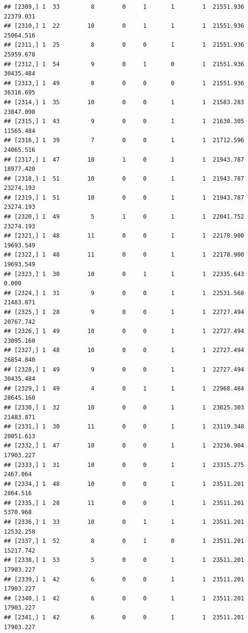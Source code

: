 \documentclass[
]{article}
\begin{document}
\begin{verbatim}
## [2309,] 1  33         8        0     1       1        1  21551.936  22379.031
## [2310,] 1  22        10        0     1       1        1  21551.936  25064.516
## [2311,] 1  25         8        0     0       1        1  21551.936  25959.678
## [2312,] 1  54         9        0     1       0        1  21551.936  30435.484
## [2313,] 1  49         8        0     0       0        1  21551.936  36316.695
## [2314,] 1  35        10        0     0       1        1  21583.283  23847.098
## [2315,] 1  43         9        0     0       1        1  21630.305  11565.484
## [2316,] 1  39         7        0     0       1        1  21712.596  24065.516
## [2317,] 1  47        10        1     0       1        1  21943.787  18977.420
## [2318,] 1  51        10        0     0       1        1  21943.787  23274.193
## [2319,] 1  51        10        0     0       1        1  21943.787  23274.193
## [2320,] 1  49         5        1     0       1        1  22041.752  23274.193
## [2321,] 1  48        11        0     0       1        1  22178.900  19693.549
## [2322,] 1  48        11        0     0       1        1  22178.900  19693.549
## [2323,] 1  30        10        0     1       1        1  22335.643      0.000
## [2324,] 1  31         9        0     0       1        1  22531.568  21483.871
## [2325,] 1  28         9        0     0       1        1  22727.494  20767.742
## [2326,] 1  49        10        0     0       1        1  22727.494  23095.160
## [2327,] 1  48        10        0     0       1        1  22727.494  26854.840
## [2328,] 1  49         9        0     0       1        1  22727.494  30435.484
## [2329,] 1  49         4        0     1       1        1  22968.484  28645.160
## [2330,] 1  32        10        0     0       1        1  23025.303  21483.871
## [2331,] 1  30        11        0     0       1        1  23119.348  20051.613
## [2332,] 1  47        10        0     0       1        1  23236.904  17903.227
## [2333,] 1  31        10        0     0       1        1  23315.275   2467.064
## [2334,] 1  48        10        0     0       1        1  23511.201   2864.516
## [2335,] 1  28        11        0     0       1        1  23511.201   5370.968
## [2336,] 1  33        10        0     1       1        1  23511.201  12532.258
## [2337,] 1  52         8        0     1       0        1  23511.201  15217.742
## [2338,] 1  53         5        0     0       1        1  23511.201  17903.227
## [2339,] 1  42         6        0     0       1        1  23511.201  17903.227
## [2340,] 1  42         6        0     0       1        1  23511.201  17903.227
## [2341,] 1  42         6        0     0       1        1  23511.201  17903.227

\end{verbatim}
\end{document}
